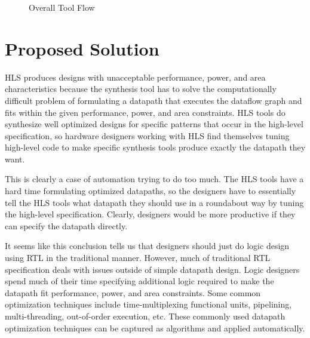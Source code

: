 \begin{figure}
	\centering
    \caption{Overall Tool Flow}
	\label{fig:workflow}
\end{figure}

\section{Proposed Solution}
HLS produces designs with unacceptable performance, power, and area characteristics because the synthesis tool has to solve the computationally difficult problem of formulating a datapath that executes the dataflow graph and fits within the given performance, power, and area constraints. HLS tools do synthesize well optimized designs for specific patterns that occur in the high-level specification, so hardware designers working with HLS find themselves tuning high-level code to make specific synthesis tools produce exactly the datapath they want. 

This is clearly a case of automation trying to do too much. The HLS tools have a hard time formulating optimized datapaths, so the designers have to essentially tell the HLS tools what datapath they should use in a roundabout way by tuning the high-level specification. Clearly, designers would be more productive if they can specify the datapath directly. 

It seems like this conclusion tells us that designers should just do logic design using RTL in the traditional manner. However, much of traditional RTL specification deals with issues outside of simple datapath design. Logic designers spend much of their time specifying additional logic required to make the datapath fit performance, power, and area constraints. Some common optimization techniques include time-multiplexing functional units, pipelining, multi-threading, out-of-order execution, etc. These commonly used datapath optimization techniques can be captured as algorithms and applied automatically.


